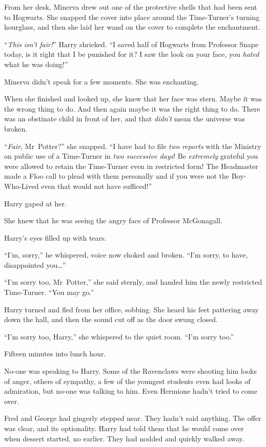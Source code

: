 From her desk, Minerva drew out one of the protective shells that had been sent to Hogwarts. She snapped the cover into place around the Time-Turner’s turning hourglass, and then she laid her wand on the cover to complete the enchantment.

“\emph{This isn’t fair!}” Harry shrieked. “I saved half of Hogwarts from Professor Snape today, is it right that I be punished for it? I saw the look on your face, you \emph{hated} what he was doing!”

Minerva didn’t speak for a few moments. She was enchanting.

When she finished and looked up, she knew that her face was stern. Maybe it was the wrong thing to do. And then again maybe it was the right thing to do. There was an obstinate child in front of her, and that \emph{didn’t} mean the universe was broken.

“\emph{Fair}, Mr~Potter?” she snapped. “I have had to file \emph{two reports} with the Ministry on public use of a Time-Turner in \emph{two successive days}! Be \emph{extremely} grateful you were allowed to retain the Time-Turner even in restricted form! The Headmaster made a Floo call to plead with them personally and if you were not the Boy-Who-Lived even that would not have sufficed!”

Harry gaped at her.

She knew that he was seeing the angry face of Professor McGonagall.

Harry’s eyes filled up with tears.

“I’m, sorry,” he whispered, voice now choked and broken. “I’m sorry, to have, disappointed you…”

“I’m sorry too, Mr~Potter,” she said sternly, and handed him the newly restricted Time-Turner. “You may go.”

Harry turned and fled from her office, sobbing. She heard his feet pattering away down the hall, and then the sound cut off as the door swung closed.

“I’m sorry too, Harry,” she whispered to the quiet room. “I’m sorry too.”

\later

Fifteen minutes into lunch hour.

No-one was speaking to Harry. Some of the Ravenclaws were shooting him looks of anger, others of sympathy, a few of the youngest students even had looks of admiration, but no-one was talking to him. Even Hermione hadn’t tried to come over.

Fred and George had gingerly stepped near. They hadn’t said anything. The offer was clear, and its optionality. Harry had told them that he would come over when dessert started, no earlier. They had nodded and quickly walked away.

